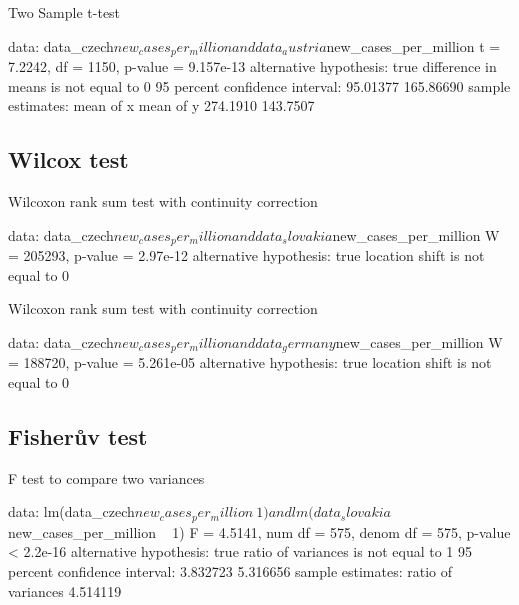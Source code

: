 \documentclass[a4paper]{ article}
\begin{document}
\begin{Schunk}
\begin{Soutput}
	Two Sample t-test

data:  data_czech$new_cases_per_million and data_austria$new_cases_per_million
t = 7.2242, df = 1150, p-value = 9.157e-13
alternative hypothesis: true difference in means is not equal to 0
95 percent confidence interval:
  95.01377 165.86690
sample estimates:
mean of x mean of y 
 274.1910  143.7507 
\end{Soutput}
\end{Schunk}

\subsection{Wilcox test}

\begin{Schunk}
\begin{Soutput}
	Wilcoxon rank sum test with continuity correction

data:  data_czech$new_cases_per_million and data_slovakia$new_cases_per_million
W = 205293, p-value = 2.97e-12
alternative hypothesis: true location shift is not equal to 0
\end{Soutput}
\end{Schunk}

\begin{Schunk}
\begin{Soutput}
	Wilcoxon rank sum test with continuity correction

data:  data_czech$new_cases_per_million and data_germany$new_cases_per_million
W = 188720, p-value = 5.261e-05
alternative hypothesis: true location shift is not equal to 0
\end{Soutput}
\end{Schunk}

\clearpage

\subsection{Fisherův test}

\begin{Schunk}
\begin{Soutput}
	F test to compare two variances

data:  lm(data_czech$new_cases_per_million ~ 1) and lm(data_slovakia$new_cases_per_million ~ 1)
F = 4.5141, num df = 575, denom df = 575, p-value < 2.2e-16
alternative hypothesis: true ratio of variances is not equal to 1
95 percent confidence interval:
 3.832723 5.316656
sample estimates:
ratio of variances 
          4.514119 
\end{Soutput}
\end{Schunk}
\end{document}
